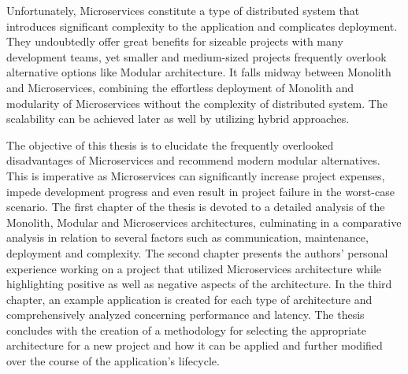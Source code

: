 Unfortunately, Microservices constitute a type of distributed system that introduces significant complexity to the application and complicates deployment. They undoubtedly offer great benefits for sizeable projects with many development teams, yet smaller and medium-sized projects frequently overlook alternative options like Modular architecture. It falls midway between Monolith and Microservices, combining the effortless deployment of Monolith and modularity of Microservices without the complexity of distributed system. The scalability can be achieved later as well by utilizing hybrid approaches.

The objective of this thesis is to elucidate the frequently overlooked disadvantages of Microservices and recommend modern modular alternatives. This is imperative as Microservices can significantly increase project expenses, impede development progress and even result in project failure in the worst-case scenario. The first chapter of the thesis is devoted to a detailed analysis of the Monolith, Modular and Microservices architectures, culminating in a comparative analysis in relation to several factors such as communication, maintenance, deployment and complexity. The second chapter presents the authors' personal experience working on a project that utilized Microservices architecture while highlighting positive as well as negative aspects of the architecture. In the third chapter, an example application is created for each type of architecture and comprehensively analyzed concerning performance and latency.  The thesis concludes with the creation of a methodology for selecting the appropriate architecture for a new project and how it can be applied and further modified over the course of the application's lifecycle.






